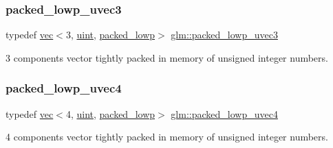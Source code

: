 \subsubsection{\texorpdfstring{packed\+\_\+lowp\+\_\+uvec3}{packed\_lowp\_uvec3}}
{\footnotesize\ttfamily typedef \mbox{\hyperlink{structglm_1_1vec}{vec}}$<$3, \mbox{\hyperlink{group__core__precision_ga4fd29415871152bfb5abd588334147c8}{uint}}, \mbox{\hyperlink{namespaceglm_a36ed105b07c7746804d7fdc7cc90ff25ac36a4bd74559be2c0b65bc48e5953b8b}{packed\+\_\+lowp}}$>$ \mbox{\hyperlink{group__gtc__type__aligned_ga895469f176463355d8b0a4bd8a4eaf45}{glm\+::packed\+\_\+lowp\+\_\+uvec3}}}



3 components vector tightly packed in memory of unsigned integer numbers. 

\mbox{\label{group__gtc__type__aligned_gaddae01027a0dc8e3d953a3ca68b5a0cd}} 
\subsubsection{\texorpdfstring{packed\+\_\+lowp\+\_\+uvec4}{packed\_lowp\_uvec4}}
{\footnotesize\ttfamily typedef \mbox{\hyperlink{structglm_1_1vec}{vec}}$<$4, \mbox{\hyperlink{group__core__precision_ga4fd29415871152bfb5abd588334147c8}{uint}}, \mbox{\hyperlink{namespaceglm_a36ed105b07c7746804d7fdc7cc90ff25ac36a4bd74559be2c0b65bc48e5953b8b}{packed\+\_\+lowp}}$>$ \mbox{\hyperlink{group__gtc__type__aligned_gaddae01027a0dc8e3d953a3ca68b5a0cd}{glm\+::packed\+\_\+lowp\+\_\+uvec4}}}



4 components vector tightly packed in memory of unsigned integer numbers. 

\mbox{\label{group__gtc__type__aligned_ga23472ebc3f98baab2a17053bc3788a9c}} 
